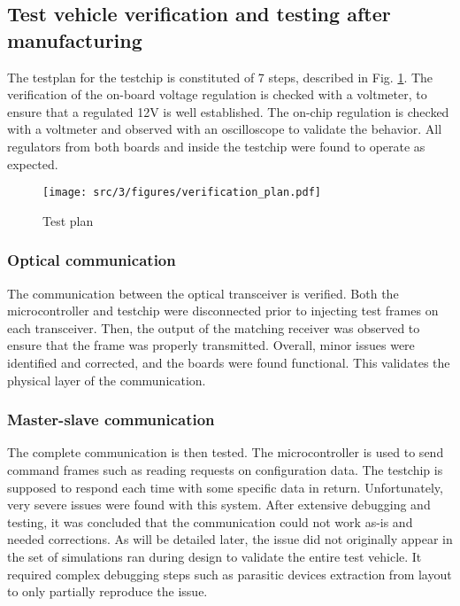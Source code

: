\subsection{Test vehicle verification and testing after manufacturing}
\label{sec:test-vehicle-testing}

The testplan for the testchip is constituted of 7 steps, described in Fig. \ref{fig:verif-plan}.
The verification of the on-board voltage regulation is checked with a voltmeter, to ensure that a regulated 12V is well established.
The on-chip regulation is checked with a voltmeter and observed with an oscilloscope to validate the behavior.
All regulators from both boards and inside the testchip were found to operate as expected.

\begin{figure}[!h]
  \centering
  \texttt{[image: src/3/figures/verification\_plan.pdf]}
  \caption{Test plan}
  \label{fig:verif-plan}
\end{figure}


\subsubsection{Optical communication}

The communication between the optical transceiver is verified.
Both the microcontroller and testchip were disconnected prior to injecting test frames on each transceiver.
Then, the output of the matching receiver was observed to ensure that the frame was properly transmitted.
Overall, minor issues were identified and corrected, and the boards were found functional.
This validates the physical layer of the communication.

\subsubsection{Master-slave communication}

The complete communication is then tested.
The microcontroller is used to send command frames such as reading requests on configuration data.
The testchip is supposed to respond each time with some specific data in return.
Unfortunately, very severe issues were found with this system.
After extensive debugging and testing, it was concluded that the communication could not work as-is and needed corrections.
As will be detailed later, the issue did not originally appear in the set of simulations ran during design to validate the entire test vehicle.
It required complex debugging steps such as parasitic devices extraction from layout to only partially reproduce the issue.

